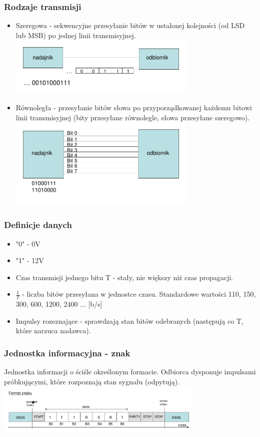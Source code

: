 \documentclass[a4paper,twoside]{article}
\begin{document}
		\subsubsection{Rodzaje transmisji}
		\begin{itemize}
			\item Szeregowa - sekwencyjne przesyłanie bitów w ustalonej kolejności (od LSD lub MSB) po jednej linii transmisyjnej.\\
			\includegraphics[width=9cm]{./wyklady/RS232_2_1.pdf}
			\item Równoległa - przesyłanie bitów słowa po przyporządkowanej każdemu bitowi linii transmisyjnej (bity przesyłane równolegle, słowa przesyłane szeregowo).\\
			\includegraphics[width=9cm]{./wyklady/RS232_2_2.pdf}
		\end{itemize}
		\subsubsection{Definicje danych}
		\begin{itemize}
			\item "0" - 0V
			\item "1" - 12V
			\item Czas transmisji jednego bitu T - stały, nie większy niż czas propagacji.
			\item $\frac{1}{T}$ - liczba bitów przesyłana w jednostce czasu. Standardowe wartości 110, 150, 300, 600, 1200, 2400 ... [b/s]
			\item Impulsy rozeznające - sprawdzają stan bitów odebranych (następują co T, które narzuca nadawca).
		\end{itemize}
		\subsubsection{Jednostka informacyjna - znak}
		Jednostka informacji o ściśle określonym formacie. Odbiorca dysponuje impulsami próbkującymi, które rozpoznają stan sygnału (odpytują).\\
		\includegraphics[width=10cm]{./wyklady/RS232_3_2.pdf}\\
\end{document}
